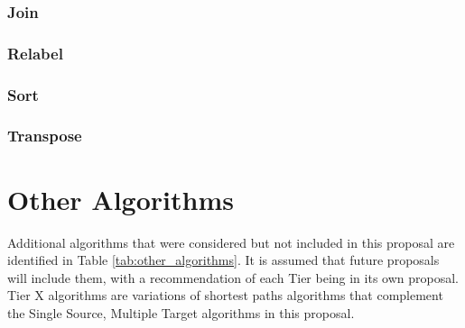 \subsection{Join}

\subsection{Relabel}

\subsection{Sort}

\subsection{Transpose}




\chapter{Other Algorithms}

Additional algorithms that were considered but not included in this proposal are identified in Table \ref{tab:other_algorithms}. 
It is assumed that future proposals will include them, with a recommendation of each Tier being in its own proposal.
Tier X algorithms are variations of shortest paths algorithms that complement the Single Source, Multiple Target algorithms 
in this proposal.

